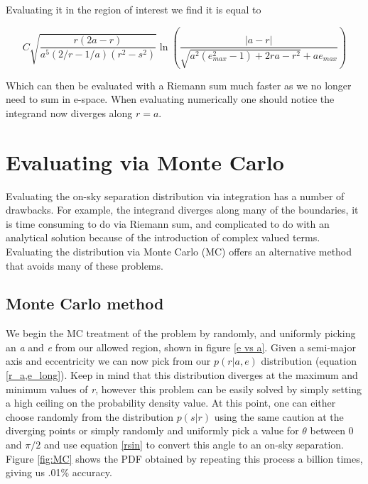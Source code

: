 \documentclass{article}
\begin{document}
	Evaluating it in the region of interest we find it is equal to 
	
	\begin{equation}
	C \sqrt{\frac{r(2a - r)}{a^5(2/r - 1/a)(r^2 - s^2)}}\ln{\left( \frac{|a - r|}{\sqrt{a^2(e_{max}^2 - 1) + 2ra - r^2} +ae_{max}} \right)}
	\end{equation}
	
	Which can then be evaluated with a Riemann sum much faster as we no longer need to sum in e-space. When evaluating numerically one should notice the integrand now diverges along $r = a$.
	
	\section{Evaluating via Monte Carlo}
	Evaluating the on-sky separation distribution via integration has a number of drawbacks. For example, the integrand diverges along many of the boundaries, it is time consuming to do via Riemann sum, and complicated to do with an analytical solution because of the introduction of complex valued terms. Evaluating the distribution via Monte Carlo (MC) offers an alternative method that avoids many of these problems. 
	
	\subsection{Monte Carlo method}
	We begin the MC treatment of the problem by randomly, and uniformly picking an \textit{a} and \textit{e} from our allowed region, shown in figure \ref{e vs a}. Given a semi-major axis and eccentricity we can now pick from our $p(r|a,e)$ distribution (equation \eqref{r_a,e_long}). Keep in mind that this distribution diverges at the maximum and minimum values of \textit{r}, however this problem can be easily solved by simply setting a high ceiling on the probability density value. At this point, one can either choose randomly from the distribution $p(s|r)$ using the same caution at the diverging points or simply randomly and uniformly pick a value for $\theta$ between 0 and $\pi/2$ and use equation \eqref{rsin} to convert this angle to an on-sky separation. Figure \ref{fig:MC} shows the PDF obtained by repeating this process a billion times, giving us .01\% accuracy. 
	
\end{document}
